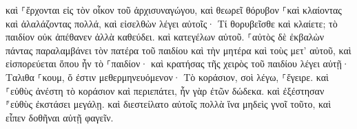\documentclass{openreader}
\begin{document}
καὶ ⸀ἔρχονται εἰς τὸν οἶκον τοῦ ἀρχισυναγώγου, καὶ θεωρεῖ θόρυβον ⸀καὶ κλαίοντας καὶ ἀλαλάζοντας πολλά, 
καὶ εἰσελθὼν λέγει αὐτοῖς· Τί θορυβεῖσθε καὶ κλαίετε; τὸ παιδίον οὐκ ἀπέθανεν ἀλλὰ καθεύδει. 
καὶ κατεγέλων αὐτοῦ. ⸀αὐτὸς δὲ ἐκβαλὼν πάντας παραλαμβάνει τὸν πατέρα τοῦ παιδίου καὶ τὴν μητέρα καὶ τοὺς μετ’ αὐτοῦ, καὶ εἰσπορεύεται ὅπου ἦν τὸ ⸀παιδίον· 
καὶ κρατήσας τῆς χειρὸς τοῦ παιδίου λέγει αὐτῇ· Ταλιθα ⸀κουμ, ὅ ἐστιν μεθερμηνευόμενον· Τὸ κοράσιον, σοὶ λέγω, ⸀ἔγειρε. 
καὶ ⸀εὐθὺς ἀνέστη τὸ κοράσιον καὶ περιεπάτει, ἦν γὰρ ἐτῶν δώδεκα. καὶ ἐξέστησαν ⸁εὐθὺς ἐκστάσει μεγάλῃ. 
καὶ διεστείλατο αὐτοῖς πολλὰ ἵνα μηδεὶς γνοῖ τοῦτο, καὶ εἶπεν δοθῆναι αὐτῇ φαγεῖν. 
\end{document}
